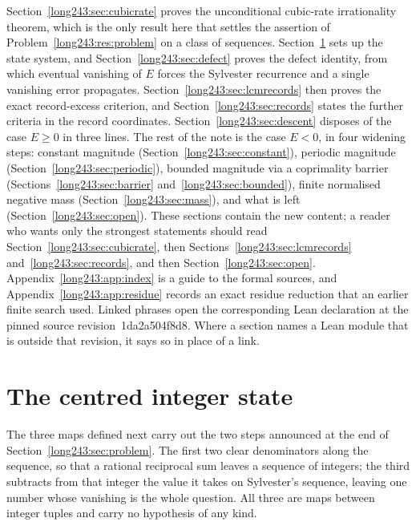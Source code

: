 \documentclass[11pt]{article}
\renewcommand{\commitshort}{1da2a504f8d8}
\begin{document}
Section~\ref{long243:sec:cubicrate} proves the unconditional cubic-rate irrationality
theorem, which is the only result here that settles the assertion of
Problem~\ref{long243:res:problem} on a class of sequences.
Section~\ref{long243:sec:state} sets up the state system, and Section~\ref{long243:sec:defect}
proves the defect identity, from which eventual vanishing of $E$ forces the
Sylvester recurrence and a single vanishing error propagates.
Section~\ref{long243:sec:lcmrecords} then proves the exact record-excess criterion, and
Section~\ref{long243:sec:records} states the further criteria in the record
coordinates.  Section~\ref{long243:sec:descent} disposes of the case $E\ge0$ in three
lines.  The rest of the note is the case $E<0$, in four widening steps:
constant magnitude (Section~\ref{long243:sec:constant}), periodic magnitude
(Section~\ref{long243:sec:periodic}), bounded magnitude via a coprimality barrier
(Sections~\ref{long243:sec:barrier} and~\ref{long243:sec:bounded}), finite normalised negative
mass (Section~\ref{long243:sec:mass}), and what is left (Section~\ref{long243:sec:open}).
These sections contain the new content; a reader who wants only the strongest
statements should read Section~\ref{long243:sec:cubicrate}, then
Sections~\ref{long243:sec:lcmrecords} and~\ref{long243:sec:records}, and
then Section~\ref{long243:sec:open}.  Appendix~\ref{long243:app:index} is a guide to the formal
sources, and Appendix~\ref{long243:app:residue} records an exact residue reduction that
an earlier finite search used.  Linked phrases open the corresponding Lean
declaration at the pinned source revision~\commitshort.  Where a section names
a Lean module that is outside that revision, it says so in place of a link.

\section{The centred integer state}\label{long243:sec:state}

The three maps defined next carry out the two steps announced at the end of
Section~\ref{long243:sec:problem}.  The first two clear denominators along the
sequence, so that a rational reciprocal sum leaves a sequence of integers; the
third subtracts from that integer the value it takes on Sylvester's sequence,
leaving one number whose vanishing is the whole question.  All three are maps
between integer tuples and carry no hypothesis of any kind.
\end{document}
